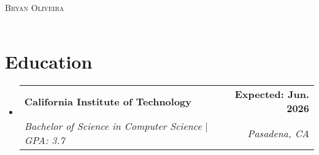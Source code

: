 \documentclass[letterpaper,11pt]{article}
\makeatletter
\newcommand{\resumeSubheading}[4]{
  \vspace{-2pt}\item
    \begin{tabular*}{1.0\textwidth}[t]{l@{\extracolsep{\fill}}r}
      \textbf{#1} & \textbf{\small #2} \\
      \textit{\small#3} & \textit{\small #4} \\
    \end{tabular*}\vspace{-7pt}
}
\newcommand{\resumeSubHeadingListStart}{\begin{itemize}[leftmargin=0.0in, label={}]}
\newcommand{\resumeSubHeadingListEnd}{\end{itemize}}
\makeatother
\begin{document}

\begin{center}
    {\Huge \scshape Bryan Oliveira} \\ \vspace{1pt}
    \small
    \href{https://github.com/BryOliveira}{\raisebox{-0.1\height}{\faGithub \scriptsize} \underline{}} ~
    \href{mailto:bryoliveira2004@gmail.com}{\raisebox{-0.1\height}{\faEnvelope \scriptsize} \underline{}} ~
    \href{https://linkedin.com/in/bryan-r-oliveira/}{\raisebox{-0.1\height}{\faLinkedin \scriptsize} \underline{}}
\end{center}


\section{Education}
  \resumeSubHeadingListStart
    \resumeSubheading
      {California Institute of Technology}{Expected: Jun. 2026}
      {Bachelor of Science in Computer Science $|$ GPA: 3.7}{Pasadena, CA}
  \resumeSubHeadingListEnd

\end{document}
